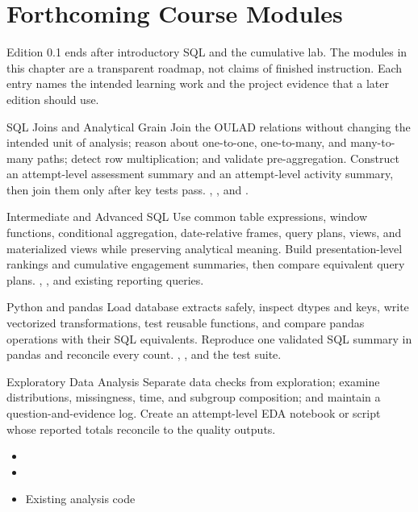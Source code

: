 \chapter{Forthcoming Course Modules}
\label{ch:forthcoming}

\begin{plainlanguage}
Edition 0.1 ends after introductory SQL and the cumulative lab. The modules in
this chapter are a transparent roadmap, not claims of finished instruction.
Each entry names the intended learning work and the project evidence that a
later edition should use.
\end{plainlanguage}

\ForthcomingChapter
  {SQL Joins and Analytical Grain}
  {Join the OULAD relations without changing the intended unit of analysis;
   reason about one-to-one, one-to-many, and many-to-many paths; detect row
   multiplication; and validate pre-aggregation.}
  {Construct an attempt-level assessment summary and an attempt-level activity
   summary, then join them only after key tests pass.}
  {, , and
   .}

\ForthcomingChapter
  {Intermediate and Advanced SQL}
  {Use common table expressions, window functions, conditional aggregation,
   date-relative frames, query plans, views, and materialized views while
   preserving analytical meaning.}
  {Build presentation-level rankings and cumulative engagement summaries, then
   compare equivalent query plans.}
  {, , and existing
   reporting queries.}

\ForthcomingChapter
  {Python and pandas}
  {Load database extracts safely, inspect dtypes and keys, write vectorized
   transformations, test reusable functions, and compare pandas operations with
   their SQL equivalents.}
  {Reproduce one validated SQL summary in pandas and reconcile every count.}
  {,
   , and the test suite.}

\ForthcomingChapter
  {Exploratory Data Analysis}
  {Separate data checks from exploration; examine distributions, missingness,
   time, and subgroup composition; and maintain a question-and-evidence log.}
  {Create an attempt-level EDA notebook or script whose reported totals reconcile
   to the quality outputs.}
  {\begin{itemize}
     \item {}
     \item {}
     \item Existing analysis code
   \end{itemize}}

